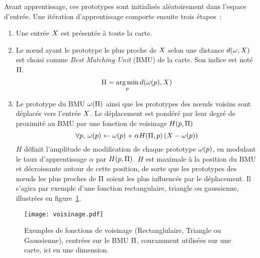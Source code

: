 \documentclass[../main]{subfiles}
\begin{document}
Avant apprentissage, ces prototypes sont initialisés aléatoirement dans l'espace d'entrée.
Une itération d'apprentissage comporte ensuite trois étapes~:
\begin{enumerate}
\item Une entrée $X$ est présentée à toute la carte.
\item Le n\oe{}ud ayant le prototype le plus proche de $X$ selon une distance $d(\omega, X)$ est choisi comme \emph{Best Matching Unit} (BMU) de la carte. Son indice est noté $\Pi$. 
\begin{equation}
    \Pi = \operatorname*{arg\,min}\limits_p d(\omega(p),X)
\end{equation}
\item Le prototype du BMU $\omega(\Pi)$ ainsi que les prototypes des n\oe{}uds voisins sont déplacés vers l'entrée $X$. Le déplacement est pondéré par leur degré de proximité au BMU par une fonction de voisinage $H(p,\Pi)$
\begin{equation} \forall p, \:\omega(p) \leftarrow \omega(p) + \alpha H(\Pi,p) \left( X - \omega(p)\right) \end{equation}
$H$ définit l'amplitude de modification de chaque prototype $\omega(p)$, en modulant le taux d'apprentissage $\alpha$ par $H(p,\Pi)$. $H$ est maximale à la position du BMU et décroissante autour de cette position, de sorte que les prototypes des n\oe{}uds les plus proches de $\Pi$ soient les plus influencés par le déplacement. Il s'agira par exemple d'une fonction rectangulaire, triangle ou gaussienne, illustrées en figure~\ref{fig:h}.
\end{enumerate}

\begin{figure}
     \centering
     \texttt{[image: voisinage.pdf]}
     \caption{Exemples de fonctions de voisinage (Rectanglulaire, Triangle ou Gaussienne), centrées sur le BMU $\Pi$, couramment utilisées sur une carte, ici en une dimension.\label{fig:h}}
\end{figure}
\end{document}
